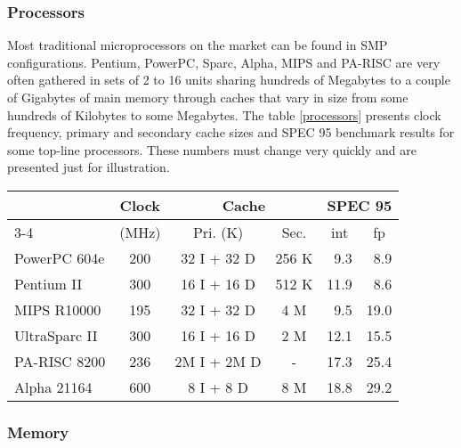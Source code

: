 	

\subsubsection{Processors}

	Most traditional microprocessors on the market can be found in SMP configurations. Pentium, PowerPC, Sparc, Alpha, MIPS and PA-RISC are very often gathered in sets of 2 to 16 units sharing hundreds of Megabytes to a couple of Gigabytes of main memory through caches that vary in size from some hundreds of Kilobytes to some Megabytes. The table \ref{processors} presents clock frequency, primary and secondary cache sizes and SPEC 95 benchmark results for some top-line processors. These numbers must change very quickly and are presented just for illustration.
	
\begin{table*}[htb]
\footnotesize
\begin{center}
\begin{tabular}{|l|c|c|c|r|r|}
\hline
 & Clock & \multicolumn{2}{c|}{Cache} & \multicolumn{2}{c|}{SPEC 95}\\
\cline{3-4} \cline{5-6}
\multicolumn{1}{|c|}{\rb{Processor}} & (MHz) & Pri. (K) & Sec. & \multicolumn{1}{|c|}{int} & \multicolumn{1}{|c|}{fp}\\
\hline
PowerPC 604e	& 200 &  32 I + 32 D & 256 K &  9.3 &  8.9\\
Pentium II	& 300 &  16 I + 16 D & 512 K & 11.9 &  8.6\\
MIPS R10000	& 195 &	 32 I + 32 D &   4 M &  9.5 & 19.0\\
UltraSparc II	& 300 &  16 I + 16 D &   2 M & 12.1 & 15.5\\
PA-RISC 8200	& 236 &	 2M I + 2M D &     - & 17.3 & 25.4\\
Alpha 21164	& 600 &   8 I +  8 D &   8 M & 18.8 & 29.2\\
\hline
\end{tabular}
\caption{Performance characteristics of some top-line processors.}
\label{processors}
\end{center}
\end{table*}
 

\subsubsection{\label{hard_proc_mem}Memory}


